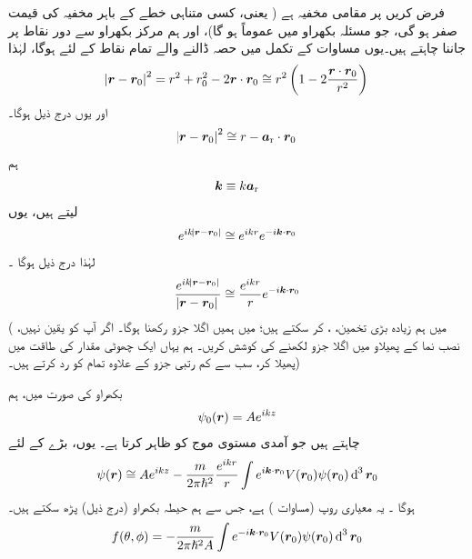 فرض کریں  پر  مقامی مخفیہ ہے ( یعنی،  کسی متناہی خطے کے باہر مخفیہ کی قیمت صفر ہو گی،  جو  مسئلہ بکھراو میں عموماً  ہو گا)،  اور ہم مرکز بکھراو سے دور نقاط  پر  جاننا چاہتے ہیں۔یوں  مساوات     کے تکمل میں حصہ ڈالنے والے تمام نقاط
 کے لئے  ہوگا،  لہٰذا
\begin{align}
	\abs{{{\boldsymbol{r}}}-{{\boldsymbol{r}}}_0}^2 = r^2+r_0^2-2{{\boldsymbol{r}}}\cdot {\ensuremath{{\boldsymbol{r}}}}_0 \cong r^2\left(1-2\frac{{{\boldsymbol{r}}}\cdot {\ensuremath{{\boldsymbol{r}}}}_0}{r^2}\right)
\end{align}
اور یوں درج ذیل ہوگا۔
\begin{align}
	\abs{{{\boldsymbol{r}}}-{{\boldsymbol{r}}}_0}^2\cong r-{{\boldsymbol{a}}_{\textup{r}}}\cdot {\ensuremath{{\boldsymbol{r}}}}_0
\end{align}
ہم 
\begin{align}
	{\ensuremath{{\boldsymbol{k}}}}\equiv k{{\boldsymbol{a}}_{\textup{r}}}
\end{align}
لیتے ہیں،  یوں
\begin{align}
	e^{ik\abs{{{\boldsymbol{r}}}-{{\boldsymbol{r}}}_0}}\cong e^{ikr}e^{-i{{\boldsymbol{k}}}\cdot {\ensuremath{{\boldsymbol{r}}}}_0}
\end{align}
  لہٰذا درج ذیل ہوگا ۔
\begin{align}
	\frac{e^{ik\abs{{{\boldsymbol{r}}}-{{\boldsymbol{r}}}_0}}}{\abs{{{\boldsymbol{r}}}-{{\boldsymbol{r}}}_0}}\cong\frac{e^{ikr}}{r}e^{-i{{\boldsymbol{k}}}\cdot {\ensuremath{{\boldsymbol{r}}}}_0}
\end{align}
(  میں ہم زیادہ بڑی تخمین،  ،   کر سکتے ہیں؛   میں ہمیں اگلا جزو  رکھنا ہوگا۔ اگر آپ کو  یقین نہیں،    نصب نما کے پھیلاو  میں  اگلا جزو  لکھنے کی کوشش کریں۔  ہم یہاں ایک چھوٹی مقدار  کی طاقت  میں پھیلا کر،  سب  سے کم رتبی جزو کے علاوہ  تمام کو رد کرتے ہیں۔)

بکھراو کی صورت میں،  ہم
\begin{align}
	\psi_0({{\boldsymbol{r}}}) = Ae^{ikz}
\end{align}
  چاہتے ہیں  جو آمدی مستوی موج کو ظاہر کرتا ہے۔ یوں، بڑے   کے لئے
\begin{align}
	\psi(\kvec{r})\cong Ae^{ikz}-\frac{m}{2\pi\hslash^2}\frac{e^{ikr}}{r}\int e^{i\kvec{k}\cdot \kvec{r}_0}V(\kvec{r}_0)\psi(\kvec{r}_0)\dif^{\,3}\kvec{r}_0
\end{align}
  ہوگا ۔ یہ معیاری روپ (مساوات ) ہے،  جس سے ہم حیطہ بکھراو (درج ذیل)   پڑھ سکتے ہیں۔
\begin{align}
	f(\theta, \phi) = -\frac{m}{2\pi\hslash^2A}\int e^{-i\kvec{k}\cdot \kvec{r}_0}V(\kvec{r}_0)\psi(\kvec{r}_0)\dif^{\,3}\kvec{r}_0 
\end{align}


